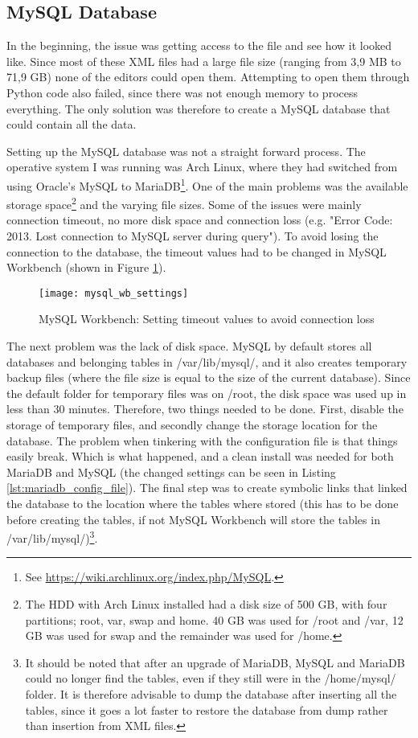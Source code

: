 \subsection{MySQL Database}
In the beginning, the issue was getting access to the file and see how it looked like. Since most of these XML 
files had a large file size (ranging from 3,9 MB to 71,9 GB) none of the editors could open them. Attempting to open 
them through Python code also failed, since there was not enough memory to process everything. The only solution 
was therefore to create a MySQL database that could contain all the data. 

Setting up the MySQL database was not a straight forward process. The operative system I was running was Arch 
Linux, where they had switched from using Oracle's MySQL to MariaDB\footnote{See 
	\url{https://wiki.archlinux.org/index.php/MySQL}.}. One of the main problems was the available storage 
space\footnote{The HDD with Arch Linux installed had a disk size of 500 GB, with four partitions; root, var, 
	swap and home. 40 GB was used for /root and /var, 12 GB was used for swap and the remainder was used for 
	/home.} and the varying file sizes. Some of the issues were mainly connection timeout, no more disk space 
and connection loss (e.g. "Error Code: 2013. Lost connection to MySQL server during query"). To avoid losing 
the connection to the database, the timeout values had to be changed in MySQL Workbench 
(shown in Figure \ref{fig:mysql_wb_settings}).

\begin{figure}[ht]
	\centering
	\texttt{[image: mysql\_wb\_settings]}
	\caption{MySQL Workbench: Setting timeout values to avoid connection loss}
	\label{fig:mysql_wb_settings}
\end{figure}

The next problem was the lack of disk space. MySQL by default stores all databases and belonging tables in 
 /var/lib/mysql/, and it also creates temporary backup files (where the file size is equal to the size of the 
 current database). Since the default folder for temporary files was on /root, the disk space was used up in 
 less than 30 minutes. Therefore, two things needed to be done. First, disable the storage of temporary files, 
 and secondly change the storage location for the database. The problem when tinkering with the configuration 
 file is that things easily break. Which is what happened, and a clean install was needed for both 
 MariaDB and MySQL (the changed settings can be seen in Listing  \ref{lst:mariadb_config_file}). The final step 
 was to create symbolic links that linked the database to the 
 location where the tables where stored (this has to be done before creating the tables, if not MySQL 
 Workbench will store the tables in /var/lib/mysql/)\footnote{It should be noted that after an upgrade of 
 	MariaDB, MySQL and MariaDB could no longer find the tables, even if they still were in the /home/mysql/ 
 	 folder. It is therefore advisable to dump the database after inserting all the tables, since it goes a lot 
 	 faster to restore the database from dump rather than insertion from XML files.}. 



